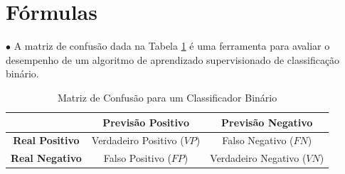 \documentclass[a4paper,12pt,oneside,onecolumn]{Config/milktest}
\begin{document}

 \newpage
\section*{Fórmulas}


\noindent $\bullet$ A matriz de confusão dada na Tabela \ref{tab:confusion_matrix} é uma ferramenta para avaliar o desempenho de um algoritmo de aprendizado supervisionado de classificação binário. 

\begin{table}[htb]
\centering
\caption{Matriz de Confusão para um Classificador Binário}
\label{tab:confusion_matrix}
\begin{tabular}{c|c|c|}
\cline{2-3}
& \multicolumn{1}{c|}{\textbf{Previsão Positivo}} & \textbf{Previsão Negativo} \\ \hline
\multicolumn{1}{|c|}{\textbf{Real Positivo}} & Verdadeiro Positivo ($VP$) & Falso Negativo ($FN$) \\ \hline
\multicolumn{1}{|c|}{\textbf{Real Negativo}} & Falso Positivo ($FP$) & Verdadeiro Negativo ($VN$) \\ \hline
\end{tabular}
\end{table}
\end{document}
